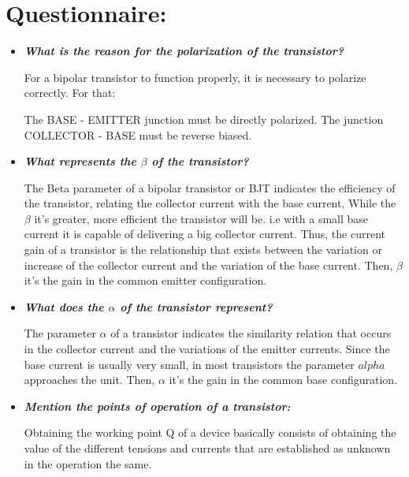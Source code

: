 \section{Questionnaire:}

\begin{itemize} 
\item {\bfseries\itshape What is the reason for the polarization of the transistor?} \hfill \break

For a bipolar transistor to function properly, it is necessary to polarize correctly. For that: 

\begin{tasks}
\task The BASE - EMITTER junction must be directly polarized. 
\task The junction COLLECTOR - BASE must be reverse biased.
\end{tasks} \hfill

\item {\bfseries\itshape What represents the $\beta$ of the transistor?} \hfill \break

The Beta parameter of a bipolar transistor or BJT indicates the efficiency of the transistor, relating
the collector current with the base current, While the $\beta$ it's greater, more efficient the
transistor will be. i.e with a small base current it is capable of delivering a big collector current. Thus, the current gain of a transistor is the relationship that exists between the variation or increase of the collector current and the variation of the base current. Then, $\beta$ it's the gain in the common emitter configuration.  \hfill \break

\item {\bfseries\itshape What does the $\alpha$ of the transistor represent?} \hfill \break

The parameter $\alpha$ of a transistor indicates the similarity relation that occurs in the collector current
and the variations of the emitter currents. Since the base current is usually very small, in most transistors the
parameter $alpha$ approaches the unit. Then, $\alpha$ it's the gain in the common base configuration.  \hfill \break

\item {\bfseries\itshape Mention the points of operation of a transistor:} \hfill \break

Obtaining the working point Q of a device basically consists of obtaining the value of the different
tensions and currents that are established as unknown in the operation the same.  \hfill \break


\end{itemize}
